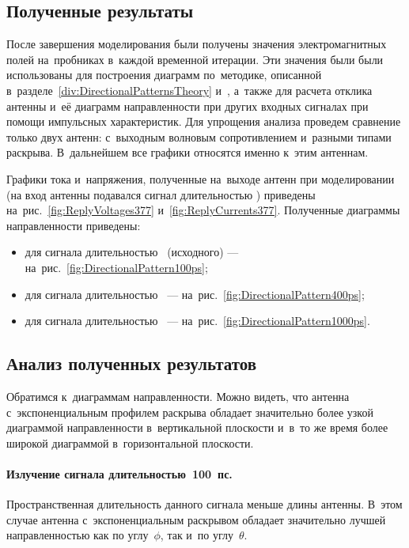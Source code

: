 \subsection{Полученные результаты}

После завершения моделирования были получены значения электромагнитных полей
на~пробниках в~каждой временной итерации. Эти значения были были использованы
для построения диаграмм по~методике, описанной
    в~разделе~\ref{div:DirectionalPatternsTheory}
    и~\cite{bib:MescheryakovUnpublishedReport},
а~также для расчета отклика антенны и~её диаграмм направленности при других
входных сигналах при помощи импульсных характеристик. Для упрощения анализа
проведем сравнение только двух антенн: с~выходным волновым сопротивлением
 и~разными типами раскрыва. В~дальнейшем все графики относятся
именно к~этим антеннам.

Графики тока и~напряжения, полученные на~выходе антенн при моделировании
(на вход антенны подавался сигнал длительностью ) приведены
    на~рис.~\ref{fig:ReplyVoltages377}
    и~\ref{fig:ReplyCurrents377}.
Полученные диаграммы направленности приведены:
\begin{itemize}
\item для сигнала длительностью~ (исходного) ---
      на~рис.~\ref{fig:DirectionalPattern100ps};
\item для сигнала длительностью~ ---
      на~рис.~\ref{fig:DirectionalPattern400ps};
\item для сигнала длительностью~ ---
      на~рис.~\ref{fig:DirectionalPattern1000ps}.
\end{itemize}


\subsection{Анализ полученных результатов}

Обратимся к~диаграммам направленности. Можно видеть, что антенна
с~экспоненциальным профилем раскрыва обладает значительно более узкой диаграммой
направленности в~вертикальной плоскости и~в~то же время более широкой диаграммой
в~горизонтальной плоскости.

\paragraph*{Излучение сигнала длительностью~100~пс.}
Пространственная длительность данного сигнала меньше длины антенны. В~этом
случае антенна с~экспоненциальным раскрывом обладает значительно лучшей
направленностью как по углу~$\phi$, так и~по углу~$\theta$.

